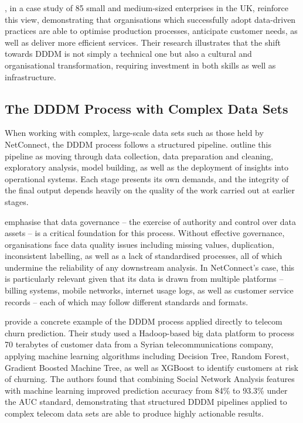 \documentclass[12pt,a4paper]{article}
\begin{document}
\textcite{Tawil2023}, in a case study of 85 small and medium-sized enterprises in the UK, reinforce this view, demonstrating that organisations which successfully adopt data-driven practices are able to optimise production processes, anticipate customer needs, as well as deliver more efficient services. Their research illustrates that the shift towards DDDM is not simply a technical one but also a cultural and organisational transformation, requiring investment in both skills as well as infrastructure.

\subsection{The DDDM Process with Complex Data Sets}

When working with complex, large-scale data sets such as those held by NetConnect, the DDDM process follows a structured pipeline. \textcite{Sarker2021} outline this pipeline as moving through data collection, data preparation and cleaning, exploratory analysis, model building, as well as the deployment of insights into operational systems. Each stage presents its own demands, and the integrity of the final output depends heavily on the quality of the work carried out at earlier stages.

\textcite{Li2024} emphasise that data governance -- the exercise of authority and control over data assets -- is a critical foundation for this process. Without effective governance, organisations face data quality issues including missing values, duplication, inconsistent labelling, as well as a lack of standardised processes, all of which undermine the reliability of any downstream analysis. In NetConnect's case, this is particularly relevant given that its data is drawn from multiple platforms -- billing systems, mobile networks, internet usage logs, as well as customer service records -- each of which may follow different standards and formats.

\textcite{Ahmad2019} provide a concrete example of the DDDM process applied directly to telecom churn prediction. Their study used a Hadoop-based big data platform to process 70 terabytes of customer data from a Syrian telecommunications company, applying machine learning algorithms including Decision Tree, Random Forest, Gradient Boosted Machine Tree, as well as XGBoost to identify customers at risk of churning. The authors found that combining Social Network Analysis features with machine learning improved prediction accuracy from 84\% to 93.3\% under the AUC standard, demonstrating that structured DDDM pipelines applied to complex telecom data sets are able to produce highly actionable results.
\end{document}
